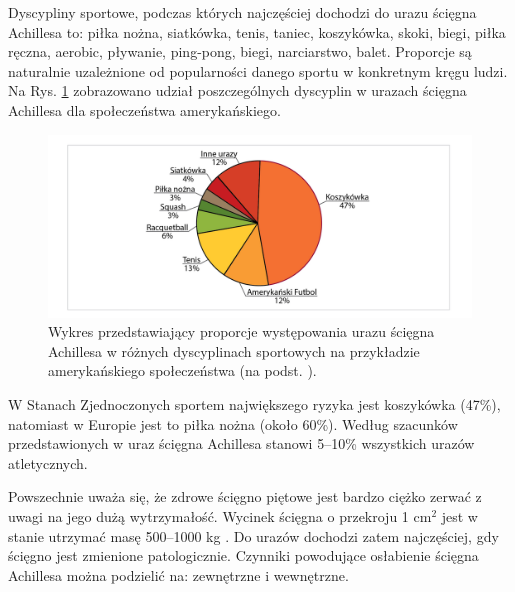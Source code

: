 Dyscypliny sportowe, podczas których najczęściej dochodzi do urazu ścięgna Achillesa to: piłka nożna, siatkówka, tenis, taniec, koszykówka, skoki, biegi, piłka ręczna, aerobic, pływanie, ping-pong, biegi, narciarstwo, balet. Proporcje są naturalnie uzależnione od popularności danego sportu w konkretnym kręgu ludzi. Na Rys. \ref{rupture} zobrazowano udział poszczególnych dyscyplin w urazach ścięgna Achillesa dla społeczeństwa amerykańskiego. 
\begin{figure}[h!]
	\centering
	\includegraphics[width=1\textwidth]{figures/Achilles_zerwanie.png}
	\caption{Wykres przedstawiający proporcje występowania urazu ścięgna Achillesa w różnych dyscyplinach sportowych na przykładzie amerykańskiego społeczeństwa (na podst. \cite{EpidemiologyUS}).}
	\label{rupture}
\end{figure}
W Stanach Zjednoczonych sportem największego ryzyka jest koszykówka (47\%), natomiast w Europie jest to piłka nożna (około 60\%). Według szacunków przedstawionych w \cite{CHIRALI2014211} uraz ścięgna Achillesa stanowi 5--10\% wszystkich urazów atletycznych.

Powszechnie uważa się, że zdrowe ścięgno piętowe jest bardzo ciężko zerwać z uwagi na jego dużą wytrzymałość. Wycinek ścięgna o przekroju 1 cm$^2$ jest w stanie utrzymać masę 500--1000 kg \cite{Maquirriain2011}. Do urazów dochodzi zatem najczęściej, gdy ścięgno jest zmienione patologicznie. Czynniki powodujące osłabienie ścięgna Achillesa można podzielić na: zewnętrzne i wewnętrzne.

